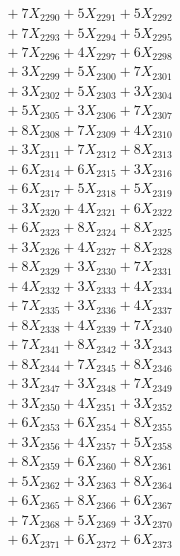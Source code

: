 \documentclass[a4paper,10pt]{article}
\begin{document}
{\begin{align}
&\;  + 7 X_{2290} + 5 X_{2291} + 5 X_{2292} \\[0.3ex]
&\;  + 7 X_{2293} + 5 X_{2294} + 5 X_{2295} \\[0.3ex]
&\;  + 7 X_{2296} + 4 X_{2297} + 6 X_{2298} \\[0.3ex]
&\;  + 3 X_{2299} + 5 X_{2300} + 7 X_{2301} \\[0.3ex]
&\;  + 3 X_{2302} + 5 X_{2303} + 3 X_{2304} \\[0.3ex]
&\;  + 5 X_{2305} + 3 X_{2306} + 7 X_{2307} \\[0.3ex]
&\;  + 8 X_{2308} + 7 X_{2309} + 4 X_{2310} \\[0.3ex]
&\;  + 3 X_{2311} + 7 X_{2312} + 8 X_{2313} \\[0.3ex]
&\;  + 6 X_{2314} + 6 X_{2315} + 3 X_{2316} \\[0.3ex]
&\;  + 6 X_{2317} + 5 X_{2318} + 5 X_{2319} \\[0.5ex]\allowbreak
&\;  + 3 X_{2320} + 4 X_{2321} + 6 X_{2322} \\[0.3ex]
&\;  + 6 X_{2323} + 8 X_{2324} + 8 X_{2325} \\[0.3ex]
&\;  + 3 X_{2326} + 4 X_{2327} + 8 X_{2328} \\[0.3ex]
&\;  + 8 X_{2329} + 3 X_{2330} + 7 X_{2331} \\[0.3ex]
&\;  + 4 X_{2332} + 3 X_{2333} + 4 X_{2334} \\[0.3ex]
&\;  + 7 X_{2335} + 3 X_{2336} + 4 X_{2337} \\[0.3ex]
&\;  + 8 X_{2338} + 4 X_{2339} + 7 X_{2340} \\[0.3ex]
&\;  + 7 X_{2341} + 8 X_{2342} + 3 X_{2343} \\[0.3ex]
&\;  + 8 X_{2344} + 7 X_{2345} + 8 X_{2346} \\[0.3ex]
&\;  + 3 X_{2347} + 3 X_{2348} + 7 X_{2349} \\[0.5ex]\allowbreak
&\;  + 3 X_{2350} + 4 X_{2351} + 3 X_{2352} \\[0.3ex]
&\;  + 6 X_{2353} + 6 X_{2354} + 8 X_{2355} \\[0.3ex]
&\;  + 3 X_{2356} + 4 X_{2357} + 5 X_{2358} \\[0.3ex]
&\;  + 8 X_{2359} + 6 X_{2360} + 8 X_{2361} \\[0.3ex]
&\;  + 5 X_{2362} + 3 X_{2363} + 8 X_{2364} \\[0.3ex]
&\;  + 6 X_{2365} + 8 X_{2366} + 6 X_{2367} \\[0.3ex]
&\;  + 7 X_{2368} + 5 X_{2369} + 3 X_{2370} \\[0.3ex]
&\;  + 6 X_{2371} + 6 X_{2372} + 6 X_{2373} \\[0.3ex]

\end{align}}
\end{document}

